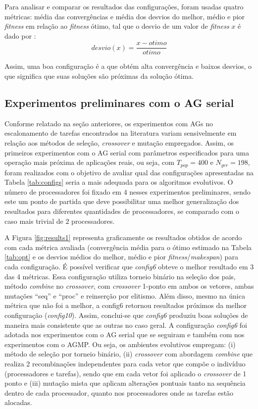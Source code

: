 \documentclass[fleqn,10pt]{SelfArx} %
\begin{document}
Para analisar e comparar os resultados das configurações, foram usadas quatro métricas: média das convergências e média dos desvios do melhor, médio e pior \textit{fitness} em relação ao \textit{fitness} ótimo, tal que o desvio de um valor de \textit{fitness} \(x\) é dado por \cite{Hou1994}:
\[ desvio(x) = \frac{x - otimo}{otimo} \]

Assim, uma boa configuração é a que obtém alta convergência e baixos desvios, o que significa que suas soluções são próximas da solução ótima.


\subsection{Experimentos preliminares com o AG serial}

Conforme relatado na seção anteriores, os experimentos com AGs no escalonamento de tarefas encontrados na literatura variam sensivelmente em relação aos métodos de seleção, \textit{crossover} e mutação empregados. Assim, os primeiros experimentos com o AG serial com parâmetros especificados para uma operação mais próxima de aplicações reais, ou seja, com \(T_{pop} = 400\) e \(N_{ger}=198\), foram realizados com o objetivo de avaliar qual das configurações apresentadas na Tabela \ref{tab:configs} seria a mais adequada para os algoritmos evolutivos. O número de processadores foi fixado em \(4\) nesses experimentos preliminares, sendo este um ponto de partida que deve possibilitar uma melhor generalização dos resultados para diferentes quantidades de processadores, se comparado com o caso mais trivial de \(2\) processadores.

A Figura \ref{fig:results1} representa graficamente os resultados obtidos de acordo com cada métrica avaliada (convergência média para o ótimo estimado na Tabela \ref{tab:opt} e os desvios médios do melhor, médio e pior \textit{fitness}/\textit{makespan}) para cada configuração. É possível verificar que \textit{config6} obteve o melhor resultado em 3 das 4 métricas. Essa configuração utiliza torneio binário na seleção dos pais, método \textit{combine} no \textit{crossover}, com \textit{crossover} 1-ponto em ambos os vetores, ambas mutações ``seq'' e ``proc'' e reinserção por elitismo. Além disso, mesmo na única métrica que não foi a melhor, a config6 retornou resultados próximos da melhor configuração (\textit{config10}). Assim, conclui-se que \textit{config6} produziu boas soluções de maneira mais consistente que as outras no caso geral. A configuração \textit{config6} foi adotada nos experimentos com o AG serial que se seguiram e também com nos experimentos com o AGMP. Ou seja, os ambientes evolutivos empregam: (i) método de seleção por torneio binário, (ii) \textit{crossover} com abordagem \textit{combine} que realiza 2 recombinações independentes para cada vetor que compõe o indivíduo (processadores e tarefas), sendo que em cada vetor foi aplicado o \textit{crossover} de 1 ponto e (iii) mutação mista que aplicam alterações pontuais tanto na sequência dentro de cada processador, quanto nos processadores onde as tarefas estão alocadas. 
\end{document}

